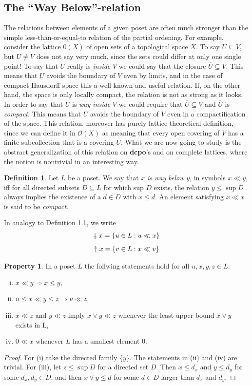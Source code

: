 \documentclass[a4paper,12pt]{article}
\newcommand{\upuparrow}{\mathrel{\reflectbox{\rotatebox[origin=c]{90}{$\twoheadrightarrow$}}}}
\newcommand{\downdownarrow}{\mathrel{\reflectbox{\rotatebox[origin=c]{90}{$\twoheadleftarrow$}}}}
\theoremstyle{definition}
\newtheorem{property}[theorem]{Property}
\newtheorem{definition}[theorem]{Definition}
\begin{document}
\subsection{The ``Way Below''-relation}\label{waybelow}
The relations between elements of a given poset are often much stronger than the simple less-than-or-equal-to relation of the partial ordening. For example, consider the lattice $\mathcal{0}(X)$ of open sets of a topological space $X$. To say $U \subseteq V$, but $U \neq V$ does not say very much, since the sets could differ at only one single point! To say that $U$ really is \emph{inside} $V$ we could say that the closure $\overline{U} \subseteq V$. This means that $U$ avoids the boundary of $V$ even by limits, and in the case of compact Hausdorff space this a well-known and useful relation. If, on the other hand, the space is only locally compact, the relation is not as strong as it looks. In order to say that $U$ is \emph{way inside} $V$ we could require that $\overline{U} \subseteq V$ and $\overline{U}$ is \emph{compact}. This means that $U$ avoids the boundary of $V$ even in a compactification of the space. This relation, moreover has purely lattice theoretical definition, since we can define it in $\mathcal{O}(X)$ as meaning that every open covering of $V$ has a finite subcollection that is a covering $U$. What we are now going to study is the abstract generalization of this relation on \textbf{dcpo}'s and on complete lattices, where the notion is nontrivial in an interesting way.

\begin{definition}
Let $L$ be a poset. We say that $x$ \emph{is way below} $y$, in symbols $x \ll  y$, iff for all directed subsets $D \subseteq L$ for which sup $D$ exists, the relation $y \leq \sup D$ always implies the existence of a $d \in D$ with $x \leq d$. An element satisfying $x \ll x$  is said to be \emph{compact}.
\end{definition}

In analogy to Definition 1.1, we write
$$\downdownarrow x =  \{u \in L: u \ll x \}$$
$$\upuparrow x =  \{v \in L: x \ll v \}$$


\begin{property}
In a poset $L$ the follwing statements hold for all $u, x, y, z \in L$:
\begin{enumerate}[(i)]
    \item $x \ll y \Rightarrow x \leq y$,
    \item $u \leq x \ll y \leq z \Rightarrow u \ll z$,
    \item $x \ll z$ and $y \ll z$ imply $x \vee y \ll z$ whenever the least upper bound $x \vee y$ exists in L,
    \item $0 \ll x$ whenever $L$ has a smallest element $0$.
\end{enumerate}
\end{property}
\begin{proof}
For (i) take the directed family $\{y\}$. The statements in (ii) and (iv) are trivial. For (iii), let $z \leq \sup D$ for a directed set $D$. Then $x \leq d_x$ and $y \leq d_y$ for some $d_x, d_y \in D$, and then $x \vee y \leq d$ for some $d \in D$ larger than $d_x$ and $d_y$.
\end{proof}
\end{document}
